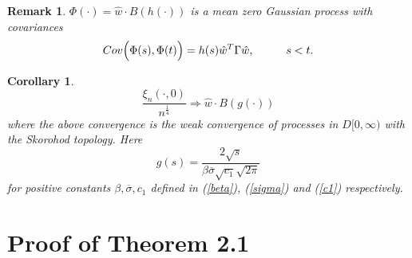 \documentclass[11pt]{amsart}
\newtheorem{corollary}[theorem]{\sc Corollary}
\newtheorem{remark}[theorem]{\sc Remark}
\begin{document}
\bigskip

\begin{remark} $\Phi(\cdot)= \hat{w} \cdot B(h(\cdot))$ is a mean zero Gaussian process  with covariances
\[ Cov\Big{(}\Phi(s),\Phi(t)\Big{)}=h(s) \hat{w}^T \Gamma \hat{w} , \hspace{1cm} s<t.\]
\end{remark}

\bigskip

\begin{corollary}
\[  \frac{\xi_n(\cdot,0)}{n^{\frac{1}{4}}} \Rightarrow \hat{w}\cdot B(g(\cdot)) \]
where the above convergence is the weak convergence of processes in $D[0,\infty)$ with the Skorohod topology. Here  
\[ g(s)=\frac{2\sqrt{s} }{\beta \overline{\sigma} \sqrt{c_1}\sqrt{2\pi}} \]
for positive constants $\beta, \overline{\sigma}, c_1$ defined in (\ref{beta}), (\ref{sigma}) and (\ref{c1}) respectively.
\end{corollary}

\bigskip

\section{Proof of Theorem 2.1}
\end{document}
